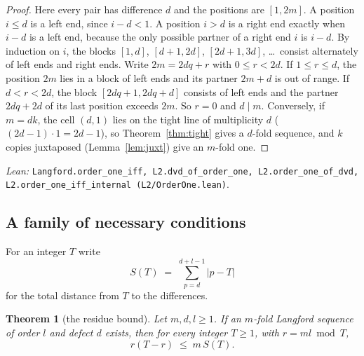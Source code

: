 \documentclass[11pt]{amsart}
\theoremstyle{plain}
\newtheorem{theorem}{Theorem}[section]
\theoremstyle{definition}
\theoremstyle{remark}
\newcommand{\lean}[1]{\par\smallskip
  {\small\raggedright\noindent\textit{Lean:} \texttt{#1}.\par}\smallskip}
\begin{document}
\begin{proof}
Here every pair has difference $d$ and the positions are $[1,2m]$. A position $i \le d$
is a left end, since $i - d < 1$. A position $i > d$ is a right end exactly when $i-d$ is
a left end, because the only possible partner of a right end $i$ is $i-d$. By induction
on $i$, the blocks $[1,d]$, $[d+1,2d]$, $[2d+1,3d]$, \dots\ consist alternately of left
ends and right ends. Write $2m = 2dq + r$ with $0 \le r < 2d$. If $1 \le r \le d$, the
position $2m$ lies in a block of left ends and its partner $2m + d$ is out of range. If
$d < r < 2d$, the block $[2dq+1,2dq+d]$ consists of left ends and the partner
$2dq + 2d$ of its last position exceeds $2m$. So $r = 0$ and $d \mid m$. Conversely, if
$m = dk$, the cell $(d,1)$ lies on the tight line of multiplicity $d$
($(2d-1)\cdot 1 = 2d-1$), so Theorem~\ref{thm:tight} gives a $d$-fold sequence, and $k$
copies juxtaposed (Lemma~\ref{lem:juxt}) give an $m$-fold one.
\end{proof}
\lean{Langford.order\_one\_iff, L2.dvd\_of\_order\_one, L2.order\_one\_of\_dvd,
L2.order\_one\_iff\_internal (L2/OrderOne.lean)}

\subsection*{A family of necessary conditions}
For an integer $T$ write
\[
  S(T) \;=\; \sum_{p=d}^{d+l-1} |p - T|
\]
for the total distance from $T$ to the differences.

\begin{theorem}[the residue bound]\label{thm:residue}
Let $m, d, l \ge 1$. If an $m$-fold Langford sequence of order $l$ and defect $d$ exists,
then for every integer $T \ge 1$, with $r = ml \bmod T$,
\[
  r(T-r) \;\le\; m\,S(T).
\]
\end{theorem}
\end{document}
